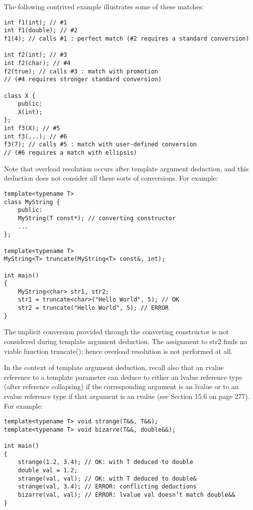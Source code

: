 The following contrived example illustrates some of these matches:

\begin{lstlisting}[style=styleCXX]
int f1(int); // #1
int f1(double); // #2
f1(4); // calls #1 : perfect match (#2 requires a standard conversion)

int f2(int); // #3
int f2(char); // #4
f2(true); // calls #3 : match with promotion
// (#4 requires stronger standard conversion)

class X {
	public:
	X(int);
};
int f3(X); // #5
int f3(...); // #6
f3(7); // calls #5 : match with user-defined conversion
// (#6 requires a match with ellipsis)
\end{lstlisting}

Note that overload resolution occurs after template argument deduction, and this deduction does not consider all these sorts of conversions. For example:

\begin{lstlisting}[style=styleCXX]
template<typename T>
class MyString {
	public:
	MyString(T const*); // converting constructor
	...
};

template<typename T>
MyString<T> truncate(MyString<T> const&, int);

int main()
{
	MyString<char> str1, str2;
	str1 = truncate<char>("Hello World", 5); // OK
	str2 = truncate("Hello World", 5); // ERROR
}
\end{lstlisting}

The implicit conversion provided through the converting constructor is not considered during template argument deduction. The assignment to str2 finds no viable function truncate(); hence overload resolution is not performed at all.

In the context of template argument deduction, recall also that an rvalue reference to a template parameter can deduce to either an lvalue reference type (after reference collapsing) if the corresponding argument is an lvalue or to an rvalue reference type if that argument is an rvalue (see Section 15.6 on page 277). For example:

\begin{lstlisting}[style=styleCXX]
template<typename T> void strange(T&&, T&&);
template<typename T> void bizarre(T&&, double&&);

int main()
{
	strange(1.2, 3.4); // OK: with T deduced to double
	double val = 1.2;
	strange(val, val); // OK: with T deduced to double&
	strange(val, 3.4); // ERROR: conflicting deductions
	bizarre(val, val); // ERROR: lvalue val doesn’t match double&&
}
\end{lstlisting}

